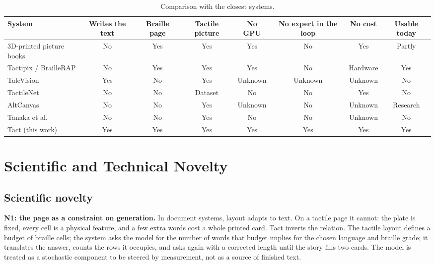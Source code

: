 \documentclass[conference]{IEEEtran}
\begin{document}
\begin{table}[t]
\caption{Comparison with the closest systems.}
\label{tab:related}
\centering
\begin{tabular}{lccccccc}
\toprule
System & Writes the text & Braille page & Tactile picture & No GPU & No expert in the loop & No cost & Usable today \\
\midrule
3D-printed picture books \cite{stangl2014,stangl2015} & No & Yes & Yes & Yes & No & Yes & Partly \\
Tactipix / BrailleRAP \cite{braillerap} & No & Yes & Yes & Yes & No & Hardware & Yes \\
TaleVision \cite{talevision} & Yes & No & Yes & Unknown & Unknown & Unknown & No \\
TactileNet \cite{tactilenet} & No & No & Dataset & No & No & Yes & No \\
AltCanvas \cite{altcanvas} & No & No & Yes & Unknown & No & Unknown & Research \\
Tanaka et al.\ \cite{tanaka2023,tanaka2025} & No & No & Yes & No & No & Unknown & No \\
Tact (this work) & Yes & Yes & Yes & Yes & Yes & Yes & Yes \\
\bottomrule
\end{tabular}
\end{table}

\section{Scientific and Technical Novelty}\label{sec:novelty}

\subsection{Scientific novelty}

\textbf{N1: the page as a constraint on generation.} In document systems, layout adapts to text. On a tactile page it cannot: the plate is fixed, every cell is a physical feature, and a few extra words cost a whole printed card. Tact inverts the relation. The tactile layout defines a budget of braille cells; the system asks the model for the number of words that budget implies for the chosen language and braille grade; it translates the answer, counts the rows it occupies, and asks again with a corrected length until the story fills two cards. The model is treated as a stochastic component to be steered by measurement, not as a source of finished text.
\end{document}
